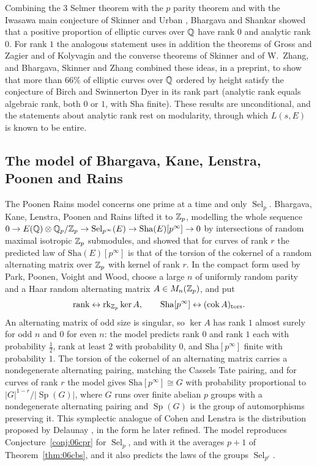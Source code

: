 Combining the $3$ Selmer theorem with the $p$ parity theorem and with the Iwasawa main conjecture of Skinner and Urban \cite{skinnerurban2014}, Bhargava and Shankar showed that a positive proportion of elliptic curves over $\mathbb{Q}$ have rank $0$ and analytic rank $0$. For rank $1$ the analogous statement uses in addition the theorems of Gross and Zagier \cite{grosszagier1986} and of Kolyvagin \cite{kolyvagin1988} and the converse theorems of Skinner and of W.~Zhang, and Bhargava, Skinner and Zhang \cite{bsz2014} combined these ideas, in a preprint, to show that more than $66\%$ of elliptic curves over $\mathbb{Q}$ ordered by height satisfy the conjecture of Birch and Swinnerton Dyer in its rank part (analytic rank equals algebraic rank, both $0$ or $1$, with $\mathrm{Sha}$ finite). These results are unconditional, and the statements about analytic rank rest on modularity, through which $L(s,E)$ is known to be entire.

\subsection{The model of Bhargava, Kane, Lenstra, Poonen and Rains}

The Poonen Rains model concerns one prime at a time and only $\operatorname{Sel}_p$. Bhargava, Kane, Lenstra, Poonen and Rains \cite{bklpr2015} lifted it to $\mathbb{Z}_p$, modelling the whole sequence $0\to E(\mathbb{Q})\otimes\mathbb{Q}_p/\mathbb{Z}_p\to\operatorname{Sel}_{p^\infty}(E)\to\mathrm{Sha}(E)[p^\infty]\to0$ by intersections of random maximal isotropic $\mathbb{Z}_p$ submodules, and showed that for curves of rank $r$ the predicted law of $\mathrm{Sha}(E)[p^\infty]$ is that of the torsion of the cokernel of a random alternating matrix over $\mathbb{Z}_p$ with kernel of rank $r$. In the compact form used by Park, Poonen, Voight and Wood, choose a large $n$ of uniformly random parity and a Haar random alternating matrix $A\in M_n(\mathbb{Z}_p)$, and put
\[
\text{rank}\leftrightarrow\operatorname{rk}_{\mathbb{Z}_p}\ker A,\qquad \mathrm{Sha}[p^\infty]\leftrightarrow(\operatorname{cok}A)_{\mathrm{tors}} .
\]
An alternating matrix of odd size is singular, so $\ker A$ has rank $1$ almost surely for odd $n$ and $0$ for even $n$: the model predicts rank $0$ and rank $1$ each with probability $\frac12$, rank at least $2$ with probability $0$, and $\mathrm{Sha}[p^\infty]$ finite with probability $1$. The torsion of the cokernel of an alternating matrix carries a nondegenerate alternating pairing, matching the Cassels Tate pairing, and for curves of rank $r$ the model gives $\mathrm{Sha}[p^\infty]\cong G$ with probability proportional to $|G|^{1-r}/|\operatorname{Sp}(G)|$, where $G$ runs over finite abelian $p$ groups with a nondegenerate alternating pairing and $\operatorname{Sp}(G)$ is the group of automorphisms preserving it. This symplectic analogue of Cohen and Lenstra is the distribution proposed by Delaunay \cite{delaunay2001}, in the form he later refined. The model reproduces Conjecture~\ref{conj:06cpr} for $\operatorname{Sel}_p$, and with it the averages $p+1$ of Theorem~\ref{thm:06cbs}, and it also predicts the laws of the groups $\operatorname{Sel}_{p^e}$.


